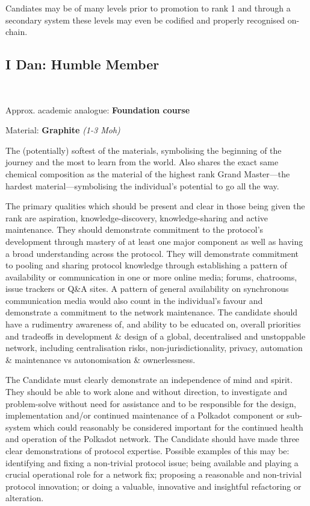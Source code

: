\documentclass[9pt,oneside]{amsart}
\begin{document}
Candiates may be of many levels prior to promotion to rank 1 and through a secondary system these levels may even be codified and properly recognised on-chain.

\subsection{I Dan: Humble Member}\label{i-dan-humble-member}~\\


Approx. academic analogue: \textbf{Foundation course}

Material: \textbf{Graphite} \emph{(1-3 Moh)}

The (potentially) softest of the materials, symbolising the beginning of the journey and the most to learn from the world. Also shares the exact same chemical composition as the material of the highest rank Grand Master---the hardest material---symbolising the individual's potential to go all the way.

The primary qualities which should be present and clear in those being given the rank are aspiration, knowledge-discovery, knowledge-sharing and active maintenance. They should demonstrate commitment to the protocol's development through mastery of at least one major component as well as having a broad understanding across the protocol. They will demonstrate commitment to pooling and sharing protocol knowledge through establishing a pattern of availability or communication in one or more online media; forums, chatrooms, issue trackers or Q\&A sites. A pattern of general availability on synchronous communication media would also count in the individual's favour and demonstrate a commitment to the network maintenance. The candidate should have a rudimentry awareness of, and ability to be educated on, overall priorities and tradeoffs in development \& design of a global, decentralised and unstoppable network, including centralisation risks, non-jurisdictionality, privacy, automation \& maintenance vs autonomisation \& ownerlessness.

The Candidate must clearly demonstrate an independence of mind and spirit. They should be able to work alone and without direction, to investigate and problem-solve without need for assistance and to be responsible for the design, implementation and/or continued maintenance of a Polkadot component or sub-system which could reasonably be considered important for the continued health and operation of the Polkadot network. The Candidate should have made three clear demonstrations of protocol expertise. Possible examples of this may be: identifying and fixing a non-trivial protocol issue; being available and playing a crucial operational role for a network fix; proposing a reasonable and non-trivial protocol innovation; or doing a valuable, innovative and insightful refactoring or alteration.
\end{document}
